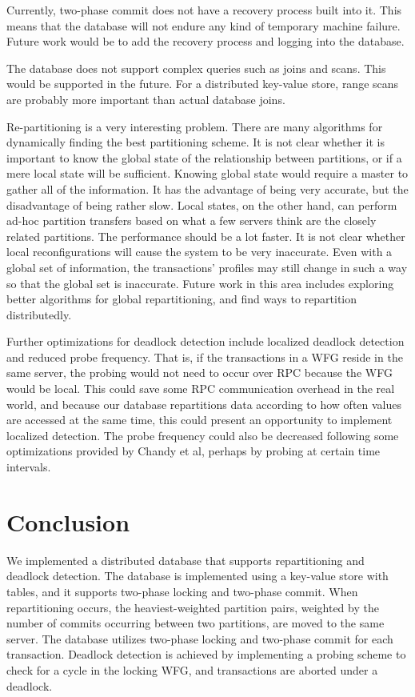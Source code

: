 \documentclass[a4paper, 10pt, notitlepage]{article}
\begin{document}
Currently, two-phase commit does not have a recovery process built into it. This means that the database will not
endure any kind of temporary machine failure. Future work would be to add the recovery process and logging into
the database.

The database does not support complex queries such as joins and scans. This would be supported in the future.
For a distributed key-value store, range scans are probably more important than actual database joins.

Re-partitioning is a very interesting problem. There are many algorithms for dynamically finding the best
partitioning scheme. It is not clear whether it is important to know the global state of the relationship
between partitions, or if a mere local state will be sufficient. Knowing global state would require a master
to gather all of the information. It has the advantage of being very accurate, but the disadvantage of being 
rather slow.
Local states, on the other hand, can perform ad-hoc partition transfers based on
what a few servers think are the closely related partitions. The performance should be a lot faster.
It is not clear whether local reconfigurations
will cause the system to be very inaccurate. Even with a global set of information, the transactions' profiles
may still change in such a way so that the global set is inaccurate. Future work in this area includes exploring better
algorithms for global repartitioning, and find ways to repartition distributedly.

Further optimizations for deadlock detection include localized deadlock detection and reduced probe frequency. That is, if the transactions in a WFG reside in the same server, the probing would not need to occur over RPC because the WFG would be local. This could save some RPC communication overhead in the real world, and because our database repartitions data according to how often values are accessed at the same time, this could present an opportunity to implement localized detection. The probe frequency could also be decreased following some optimizations provided by Chandy et al, perhaps by probing at certain time intervals.


\section{Conclusion}
We implemented a distributed database that supports repartitioning and deadlock detection. The database is implemented using a key-value store with tables, and it supports two-phase locking and two-phase commit. When repartitioning occurs, the heaviest-weighted partition pairs, weighted by the number of commits occurring between two partitions, are moved to the same server. The database utilizes two-phase locking and two-phase commit for each transaction. Deadlock detection is achieved by implementing a probing scheme to check for a cycle in the locking WFG, and transactions are aborted under a deadlock.
\end{document}
